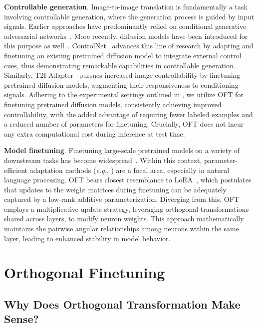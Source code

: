 \textbf{Controllable generation}. Image-to-image translation is fundamentally a task involving controllable generation, where the generation process is guided by input signals. Earlier approaches have predominantly relied on conditional generative adversarial networks~\cite{isola2017image,zhu2017toward,wang2018high,park2019semantic,choi2018stargan}. More recently, diffusion models have been introduced for this purpose as well~\cite{saharia2022palette,voynov2022sketch,wang2022pretraining}. ControlNet~\cite{zhang2023adding} advances this line of research by adapting and finetuning an existing pretrained diffusion model to integrate external control cues, thus demonstrating remarkable capabilities in controllable generation. Similarly, T2I-Adapter~\cite{mou2023t2i} pursues increased image controllability by finetuning pretrained diffusion models, augmenting their responsiveness to conditioning signals. Adhering to the experimental settings outlined in \cite{zhang2023adding,mou2023t2i}, we utilize OFT for finetuning pretrained diffusion models, consistently achieving improved controllability, with the added advantage of requiring fewer labeled examples and a reduced number of parameters for finetuning. Crucially, OFT does not incur any extra computational cost during inference at test time.

\textbf{Model finetuning}. Finetuning large-scale pretrained models on a variety of downstream tasks has become widespread~\cite{devlin2018bert,brown2020language,he2022masked}. Within this context, parameter-efficient adaptation methods (\emph{e.g.}, \cite{hulora2022,houlsby2019parameter,pfeiffer2020adapterfusion}) are a focal area, especially in natural language processing. OFT bears closest resemblance to LoRA~\cite{hulora2022}, which postulates that updates to the weight matrices during finetuning can be adequately captured by a low-rank additive parameterization. Diverging from this, OFT employs a multiplicative update strategy, leveraging orthogonal transformations shared across layers, to modify neuron weights. This approach mathematically maintains the pairwise angular relationships among neurons within the same layer, leading to enhanced stability in model behavior.

\section{Orthogonal Finetuning}

\subsection{Why Does Orthogonal Transformation Make Sense?}

